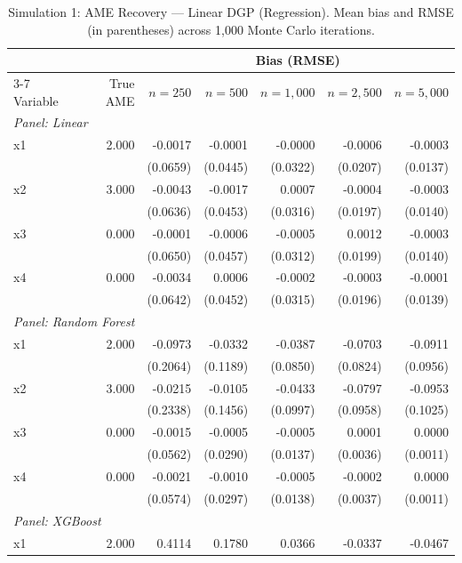 \begin{table}[htbp]
\centering
\small
\begin{threeparttable}
\caption{Simulation 1: AME Recovery --- Linear DGP (Regression). Mean bias and RMSE (in parentheses) across 1,000 Monte Carlo iterations.}
\label{tab:sim1_regression_linear}
\begin{tabular}{lrrrrrr}
\toprule
 & & \multicolumn{5}{c}{Bias (RMSE)} \\
\cmidrule(lr){3-7}
Variable & True AME & $n=250$ & $n=500$ & $n=1,000$ & $n=2,500$ & $n=5,000$ \\
\midrule
\multicolumn{7}{l}{\textit{Panel: Linear}} \\
\quad x1 & 2.000 & -0.0017 & -0.0001 & -0.0000 & -0.0006 & -0.0003 \\
 &  & (0.0659) & (0.0445) & (0.0322) & (0.0207) & (0.0137) \\
\quad x2 & 3.000 & -0.0043 & -0.0017 & 0.0007 & -0.0004 & -0.0003 \\
 &  & (0.0636) & (0.0453) & (0.0316) & (0.0197) & (0.0140) \\
\quad x3 & 0.000 & -0.0001 & -0.0006 & -0.0005 & 0.0012 & -0.0003 \\
 &  & (0.0650) & (0.0457) & (0.0312) & (0.0199) & (0.0140) \\
\quad x4 & 0.000 & -0.0034 & 0.0006 & -0.0002 & -0.0003 & -0.0001 \\
 &  & (0.0642) & (0.0452) & (0.0315) & (0.0196) & (0.0139) \\
\midrule
\multicolumn{7}{l}{\textit{Panel: Random Forest}} \\
\quad x1 & 2.000 & -0.0973 & -0.0332 & -0.0387 & -0.0703 & -0.0911 \\
 &  & (0.2064) & (0.1189) & (0.0850) & (0.0824) & (0.0956) \\
\quad x2 & 3.000 & -0.0215 & -0.0105 & -0.0433 & -0.0797 & -0.0953 \\
 &  & (0.2338) & (0.1456) & (0.0997) & (0.0958) & (0.1025) \\
\quad x3 & 0.000 & -0.0015 & -0.0005 & -0.0005 & 0.0001 & 0.0000 \\
 &  & (0.0562) & (0.0290) & (0.0137) & (0.0036) & (0.0011) \\
\quad x4 & 0.000 & -0.0021 & -0.0010 & -0.0005 & -0.0002 & 0.0000 \\
 &  & (0.0574) & (0.0297) & (0.0138) & (0.0037) & (0.0011) \\
\midrule
\multicolumn{7}{l}{\textit{Panel: XGBoost}} \\
\quad x1 & 2.000 & 0.4114 & 0.1780 & 0.0366 & -0.0337 & -0.0467 \\

\end{tabular}
\end{threeparttable}
\end{table}
